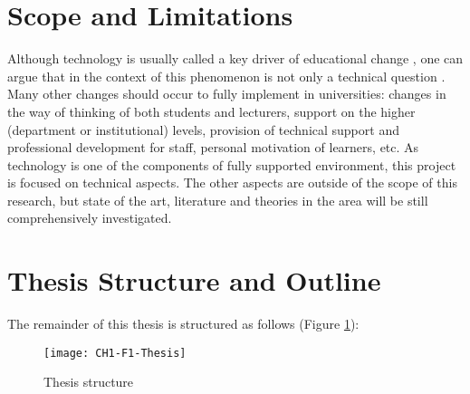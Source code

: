 \section{Scope and Limitations}

Although technology is usually called a key driver of educational change
\citep{Attwell2007}, one can argue that in the context of \LLLs this phenomenon
is not only a technical question \citep{Schaffert2008}. Many other changes
should occur to fully implement \LLLs in universities: changes in the way of
thinking of both students and lecturers, support on the higher (department or
institutional) levels, provision of technical support and professional
development for staff, personal motivation of learners, etc. As technology is
one of the components of fully supported \LLLs environment, this project is
focused on technical aspects. The other aspects are outside of the scope of
this research, but state of the art, literature and theories in the area will be
still comprehensively investigated.

\section{Thesis Structure and Outline}

The remainder of this thesis is structured as follows (Figure \ref{fig:ts}):

\begin{figure}[htb]
\centering
\texttt{[image: CH1-F1-Thesis]}
\caption{Thesis structure}
\label{fig:ts}
\end{figure}

